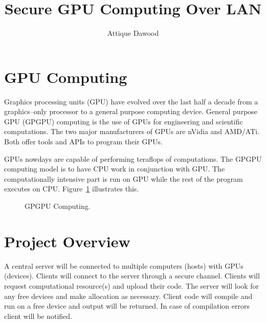 \documentclass{article}
\begin{document}
\title{Secure GPU Computing Over LAN}
\author{Attique Dawood}
\maketitle

\section{GPU Computing}

Graphics processing units (GPU) have evolved over the last half a decade from a graphics--only processor to a general purpose computing device. General purpose GPU (GPGPU) computing is the use of GPUs for engineering and scientific computations. The two major manufacturers of GPUs are nVidia and AMD/ATi. Both offer tools and APIs to program their GPUs.

GPUs nowdays are capable of performing teraflops of computations. The GPGPU computing model is to have CPU work in conjunction with GPU. The computationally intensive part is run on GPU while the rest of the program executes on CPU. Figure~\ref{nVidiaGPGPUfig} illustrates this.

\begin{figure}[here]
\centering
{}
\caption{GPGPU Computing.}
\label{nVidiaGPGPUfig}
\end{figure}

\section{Project Overview}
A central server will be connected to multiple computers (hosts) with GPUs (devices). Clients will connect to the server through a secure channel. Clients will request computational resource(s) and upload their code. The server will look for any free devices and make allocation as necessary. Client code will compile and run on a free device and output will be returned. In case of compilation errors client will be notified.
\end{document}
